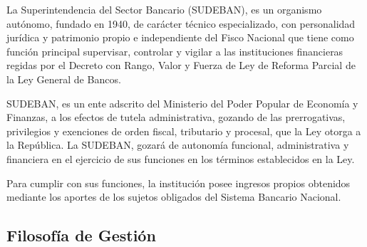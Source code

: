 \documentclass[10pt,]{article}
\begin{document}
La Superintendencia del Sector Bancario (SUDEBAN), es un organismo
autónomo, fundado en 1940, de carácter técnico especializado, con
personalidad jurídica y patrimonio propio e independiente del Fisco
Nacional que tiene como función principal supervisar, controlar y
vigilar a las instituciones financieras regidas por el Decreto con
Rango, Valor y Fuerza de Ley de Reforma Parcial de la Ley General de
Bancos.

SUDEBAN, es un ente adscrito del Ministerio del Poder Popular de
Economía y Finanzas, a los efectos de tutela administrativa, gozando de
las prerrogativas, privilegios y exenciones de orden fiscal, tributario
y procesal, que la Ley otorga a la República. La SUDEBAN, gozará de
autonomía funcional, administrativa y financiera en el ejercicio de sus
funciones en los términos establecidos en la Ley.

Para cumplir con sus funciones, la institución posee ingresos propios
obtenidos mediante los aportes de los sujetos obligados del Sistema
Bancario Nacional.

\hypertarget{filosofia-de-gestion}{%
\subsection{Filosofía de Gestión}\label{filosofia-de-gestion}}
\end{document}
